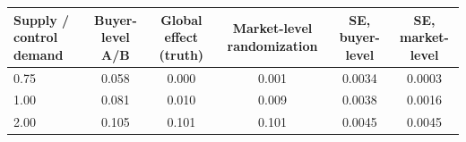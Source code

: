 \begin{tabular}{lccccc}\toprule
Supply / control demand & Buyer-level A/B & Global effect (truth) & Market-level randomization & SE, buyer-level & SE, market-level \\ \midrule
0.75 & 0.058 & 0.000 & 0.001 & 0.0034 & 0.0003 \\
1.00 & 0.081 & 0.010 & 0.009 & 0.0038 & 0.0016 \\
2.00 & 0.105 & 0.101 & 0.101 & 0.0045 & 0.0045 \\
\bottomrule\end{tabular}
